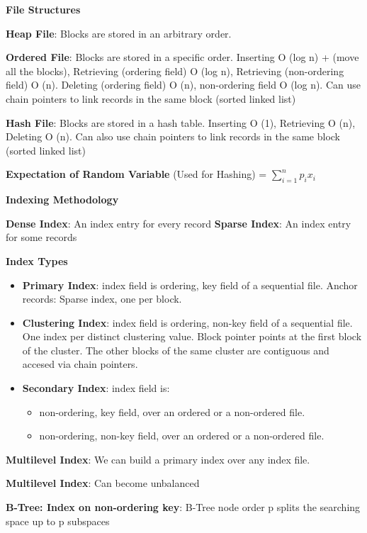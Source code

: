 \documentclass{article}
\begin{document}
\noindent \textbf{File Structures}

\noindent \textbf{Heap File}: Blocks are stored in an arbitrary order.

\noindent \textbf{Ordered File}: Blocks are stored in a specific order.
Inserting O (log n) + (move all the blocks),
Retrieving (ordering field) O (log n), Retrieving (non-ordering field) O (n).
Deleting (ordering field) O (n), non-ordering field O (log n).
Can use chain pointers to link records in the same block (sorted linked list)

\noindent \textbf{Hash File}: Blocks are stored in a hash table. Inserting O (1), Retrieving O (n), Deleting O (n).
Can also use chain pointers to link records in the same block (sorted linked list)


\noindent \textbf{Expectation of Random Variable} (Used for Hashing) = $\sum_{i=1}^{n} p_i x_i$


\noindent \textbf{Indexing Methodology}

\noindent \textbf{Dense Index}: An index entry for every record
\textbf{Sparse Index}: An index entry for some records

\noindent \textbf{Index Types}
\begin{itemize}
    \item \textbf{Primary Index}: index field is ordering, key field of a sequential file.
    Anchor records: Sparse index, one per block.
    \item \textbf{Clustering Index}: index field is ordering, non-key field of a sequential file.
    One index per distinct clustering value. Block pointer points at the first block of the cluster.
    The other blocks of the same cluster are contiguous and accesed via chain pointers.
    \item \textbf{Secondary Index}: index field is:
    \begin{itemize}
        \item non-ordering, key field, over an ordered or a non-ordered file.
        \item non-ordering, non-key field, over an ordered or a non-ordered file.
    \end{itemize}
\end{itemize}

\noindent \textbf{Multilevel Index}: We can build a primary index over any index file.

\noindent \textbf{Multilevel Index}: Can become unbalanced

\noindent \textbf{B-Tree: Index on non-ordering key}: B-Tree node order p splits the searching space up to p subspaces
\end{document}
